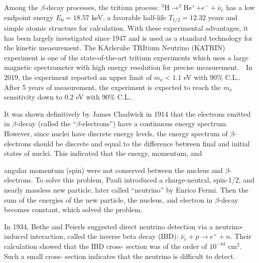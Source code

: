 Among the $\beta$-decay processes, the tritium process: $^3$H$\to^3$He$^+$+$e^-+\bar{\nu}_e$ has a low endpoint energy $E_0=18.57$ keV, a favorable half-life $T_{1/2}=12.32$ years and simple atomic structure for calculation. With these experimental advantages, it has been largely investigated since 1947 and is used as a standard technology for the kinetic measurement\cite{fukugita2013physics}. The KArlsruhe TRItium Neutrino (KATRIN) experiment is one of the state-of-the-art tritium experiments which uses a large magnetic spectrometer with high energy resolution for precise measurement.　In 2019, the experiment reported an upper limit of $m_\nu<1.1$ eV with 90\% C.L.. After 5 years of measurement, the experiment is expected to reach the $m_\nu$ sensitivity down to 0.2 eV with 90\% C.L.\cite{aker2019improved}.


It was shown definitively by James Chadwick in 1914 that the electrons emitted in $\beta$-decay (called the ``$\beta$-electrons'') have a continuous energy spectrum\cite{leite1996weak}. However, since nuclei have discrete energy levels, the energy spectrum of $\beta$-electrons should be discrete and equal to the difference between final and initial states of nuclei. This indicated that the energy, momentum, and 


angular momentum (spin) were not conserved between the nucleus and $\beta$-electrons. To solve this problem, Pauli introduced a charge-neutral, spin-1/2, and nearly massless new particle, later called ``neutrino'' by Enrico Fermi. Then the sum of the energies of the new particle, the nucleus, and electron in $\beta$-decay becomes constant, which solved the problem. 





In 1934, Bethe and Peierls suggested direct neutrino detection via a neutrino-induced interaction, called the inverse beta decay (IBD): $\bar{\nu}_e+p\to e^+ + n$. Their calculation showed that the IBD cross- section was of the order of $10^{-44}$ cm$^2$. Such a small cross- section indicates that the neutrino is difficult to detect\cite{bethe1934neutrino}.

